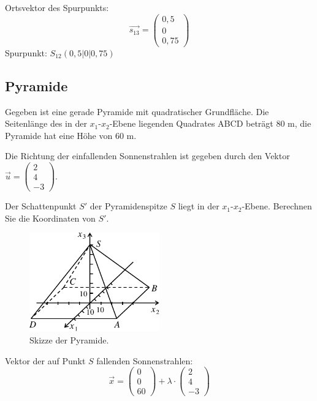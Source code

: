 \documentclass{ajc}
\numberwithin{equation}{subsection}
\begin{document}
	Ortsvektor des Spurpunkts: 
	\begin{equation}
		\overrightarrow{s_\text{13}}=\left(\begin{array}{r} 0,5 \\ 0 \\ 0,75\end{array}\right)
	\end{equation}
	Spurpunkt: $S_\text{12}(0,5|0|0,75)$
	
	\subsection{Pyramide}
	Gegeben ist eine gerade Pyramide mit quadratischer Grundfläche. Die Seitenlänge des in der $x_1$-$x_2$-Ebene liegenden Quadrates ABCD beträgt 80 m, die Pyramide hat eine Höhe von 60 m.
	
	Die Richtung der einfallenden Sonnenstrahlen ist gegeben durch den Vektor $\overrightarrow{u}=\left(\begin{array}{r} 2 \\ 4 \\ -3\end{array}\right)$.
	
	Der Schattenpunkt $S'$ der Pyramidenspitze $S$ liegt in der $x_1$-$x_2$-Ebene.
	Berechnen Sie die Koordinaten von $S'$.
	
	\begin{figure}[ht]
		\centering
		\includegraphics[width=0.5\textwidth]{ma_002_pyramide.pdf}
		\caption{Skizze der Pyramide.}
		\label{fig:002_pyramide}
	\end{figure}

	Vektor der auf Punkt $S$ fallenden Sonnenstrahlen:
	\begin{equation}
		\overrightarrow{x}=\left(\begin{array}{r} 0 \\ 0 \\ 60\end{array}\right) + \lambda \cdot \left(\begin{array}{r} 2 \\ 4 \\ -3\end{array}\right)
	\end{equation}
	
\end{document}
